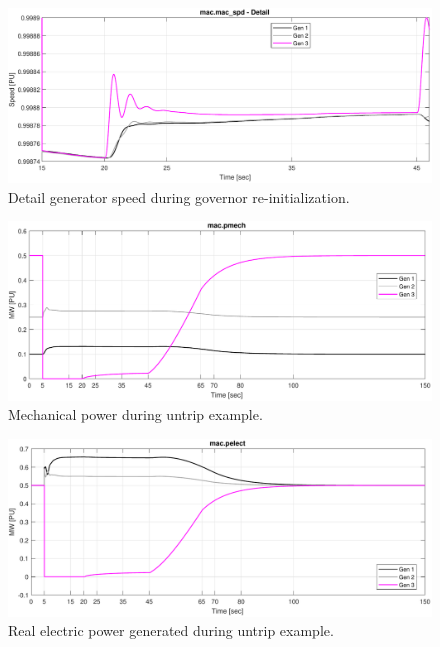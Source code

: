 \begin{figure}[H]
	\centering
	\footnotesize
	\includegraphics[width=\linewidth]{examples/untrip/combinedSpeedDetail}
	\caption{Detail generator speed during governor re-initialization.}
	\label{fig: untrip 3}
\end{figure}%

\begin{figure}[H]
	\centering
	\footnotesize
	\includegraphics[width=\linewidth]{examples/untrip/combinedPmech}
	\caption{Mechanical power during untrip example.}
	\label{fig: untrip 4}
\end{figure}%

\begin{figure}[H]
	\centering
	\footnotesize
	\includegraphics[width=\linewidth]{examples/untrip/combinedPelect}
	\caption{Real electric power generated during untrip example.}
	\label{fig: untrip 5}
\end{figure}%

